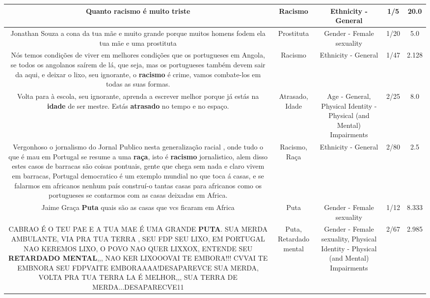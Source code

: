 \documentclass[11pt]{article}
\newlength\mylength
\begin{document}
\begin{center}
\begin{longtable}{|C{.65\mylength}|C{.30\mylength}|C{.12\mylength}|C{.12\mylength}|C{.12\mylength}|}
  \small Quanto \textbf{racismo} é muito triste\normalsize   & Racismo & Ethnicity - General & 1/5 & 20.0 \\  \hline
  \small Jonathan Souza a cona da tua mãe e muito grande porque muitos homens fodem ela tua mãe e uma prostituta\normalsize   & Prostituta & Gender - Female sexuality & 1/20 & 5.0 \\  \hline
  \small Nós temos condições de viver em melhores condições que os portugueses em Angola, se todos os angolanos saírem de lá, que seja, mas os portugueses também devem sair da aqui, e deixar o lixo, seu ignorante, o \textbf{racismo} é crime, vamos combate-los em todas as suas formas.\normalsize   & Racismo & Ethnicity - General & 1/47 & 2.128 \\  \hline
  \small Volta para à escola, seu ignorante, aprenda a escrever melhor porque já estás na \textbf{idade} de ser mestre. Estás \textbf{atrasado} no tempo e no espaço.\normalsize   & Atrasado, Idade & Age - General, Physical Identity - Physical (and Mental) Impairments & 2/25 & 8.0 \\  \hline
  \small Vergonhoso o jornalismo do Jornal Publico nesta generalização racial , onde tudo o que é mau em Portugal se resume a uma \textbf{raça},  isto é \textbf{racismo} jornalistico,  alem disso estes casos de barracas são coisas pontuais, gente que chega sem nada e claro vivem em barracas, Portugal democratico é um exemplo mundial no que toca á casas, e se falarmos em africanos nenhum país construí-o tantas casas para africanos como os portugueses se contarmos com as casas deixadas em Africa.\normalsize   & Racismo, Raça & Ethnicity - General & 2/80 & 2.5 \\  \hline
  \small Jaime Graça \textbf{Puta} quais são as casas que vcs ficaram em Africa\normalsize   & Puta & Gender - Female sexuality & 1/12 & 8.333 \\  \hline
  \small CABRAO É O TEU PAE E A TUA MAE É UMA GRANDE  \textbf{PUTA}. SUA MERDA AMBULANTE, VIA PRA TUA TERRA , SEU FDP SEU LIXO, EM PORTUGAL NAO KEREMOS LIXO, O POVO NAO QUER LIXXOX, ENTENDE SEU \textbf{RETARDADO MENTAL},,, NAO KER LIXOOOVAI TE EMBORA!!! CVVAI TE EMBNORA SEU FDPVAITE EMBORAAAA!DESAPAREVCE SUA MERDA, VOLTA PRA TUA TERRA LA É MELHOR,,, SUA TERRA DE MERDA...DESAPARECVE11\normalsize   & Puta, Retardado mental & Gender - Female sexuality, Physical Identity - Physical (and Mental) Impairments & 2/67 & 2.985 \\  \hline

\end{longtable}
\end{center}
\end{document}
